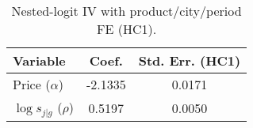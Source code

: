 \begin{table}[H]
\centering
\caption{Nested-logit IV with product/city/period FE (HC1).}
\begin{tabular}{lcc}
\toprule
Variable & Coef. & Std. Err. (HC1) \\
\midrule
Price ($\alpha$) & -2.1335 & 0.0171 \\
$\log s_{j|g}$ ($\rho$) & 0.5197 & 0.0050 \\
\bottomrule
\end{tabular}
\label{tab:q20_nl_ivfe}
\end{table}
